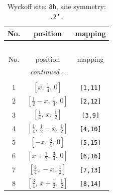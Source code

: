 \documentclass[fleqn,8pt]{jsarticle}
\begin{document}
\begin{longtable}{ccc}
\caption{Wyckoff site: {\tt 8h}, site symmetry: {\tt .2'.}}
 \\
 \hline \hline
No. & position & mapping \\ \hline \endfirsthead

\multicolumn{2}{l}{\tablename\ \thetable{}} \\
 \hline \hline
No. & position & mapping \\ \hline \endhead

 \hline \hline
\multicolumn{2}{r}{\footnotesize\it continued ...} \\ \endfoot

 \hline \hline
\multicolumn{2}{r}{} \\ \endlastfoot

1 & $\left[ x,\, \frac{1}{4},\, 0 \right]$ & {\tt [1,11]} \\ \hline
2 & $\left[ \frac{1}{2} - x,\, \frac{1}{4},\, 0 \right]$ & {\tt [2,12]} \\ \hline
3 & $\left[ \frac{1}{4},\, x,\, \frac{1}{2} \right]$ & {\tt [3,9]} \\ \hline
4 & $\left[ \frac{1}{4},\, \frac{1}{2} - x,\, \frac{1}{2} \right]$ & {\tt [4,10]} \\ \hline
5 & $\left[ - x,\, \frac{3}{4},\, 0 \right]$ & {\tt [5,15]} \\ \hline
6 & $\left[ x + \frac{1}{2},\, \frac{3}{4},\, 0 \right]$ & {\tt [6,16]} \\ \hline
7 & $\left[ \frac{3}{4},\, - x,\, \frac{1}{2} \right]$ & {\tt [7,13]} \\ \hline
8 & $\left[ \frac{3}{4},\, x + \frac{1}{2},\, \frac{1}{2} \right]$ & {\tt [8,14]} \\
\end{longtable}
\renewcommand{\arraystretch}{1.2}
\end{document}
